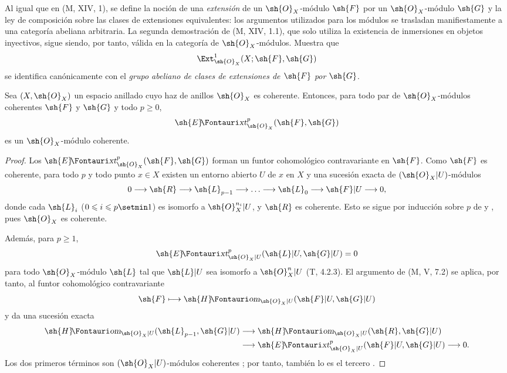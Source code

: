 \documentclass[oneside]{amsart}
\makeatletter
\renewcommand{\leq}{\leqslant}
\renewcommand{\geq}{\geqslant}
\newcommand*{\ega@sheafop}[3]{\sh{#1}#2\textup{\kern-2.2pt{\Fontauri\slshape #3}}}
\newcommand*{\shHom}{\ega@sheafop{H}{}{om}}
\newcommand*{\shExt}{\ega@sheafop{E}{}{xt}}
\let\EGAOriginalLabel\label
\renewcommand{\label}[1]{\phantomsection\EGAOriginalLabel{#1}}
\makeatother
\begin{document}
\begin{env}[12.3.2]
\label{0.12.3.2}
Al igual que en (M, XIV, 1), se define la noción de una
\emph{extensión} de un $\sh{O}_X$-módulo $\sh{F}$ por un
$\sh{O}_X$-módulo $\sh{G}$ y la ley de composición sobre las clases de
extensiones equivalentes: los argumentos utilizados para los módulos se
trasladan manifiestamente a una categoría abeliana arbitraria.
La segunda demostración de (M, XIV, 1.1), que solo utiliza la existencia de
inmersiones en objetos inyectivos, sigue siendo, por tanto, válida en la
categoría de $\sh{O}_X$-módulos.  Muestra que
\[
  \Ext^1_{\sh{O}_X}(X;\sh{F},\sh{G})
\]
se identifica canónicamente con el \emph{grupo abeliano de clases de
extensiones de $\sh{F}$ por $\sh{G}$}.
\end{env}

\begin{proposition}[12.3.3]
\label{0.12.3.3}
Sea $(X,\sh{O}_X)$ un espacio anillado cuyo haz de anillos
$\sh{O}_X$ es coherente.
Entonces, para todo par de $\sh{O}_X$-módulos coherentes $\sh{F}$ y
$\sh{G}$ y todo $p\geq0$,
\[
  \shExt^p_{\sh{O}_X}(\sh{F},\sh{G})
\]
es un $\sh{O}_X$-módulo coherente.
\end{proposition}

\begin{proof}
Los $\shExt^p_{\sh{O}_X}(\sh{F},\sh{G})$ forman un funtor cohomológico
contravariante en $\sh{F}$.
Como $\sh{F}$ es coherente, para todo $p$ y todo punto $x\in X$
existen un entorno abierto $U$ de $x$ en $X$ y una sucesión exacta
de $(\sh{O}_X|U)$-módulos
\[
  0\longrightarrow\sh{R}\longrightarrow\sh{L}_{p-1}
  \longrightarrow\ldots\longrightarrow\sh{L}_0
  \longrightarrow\sh{F}|U\longrightarrow0,
\]
donde cada $\sh{L}_i$ ($0\leq i\leq p\setmin 1$) es isomorfo a
$\sh{O}_X^{n_i}|U$, y $\sh{R}$ es coherente.
Esto se sigue por inducción sobre $p$ de
 y
, pues $\sh{O}_X$ es coherente.

Además, para $p\geq1$,
\[
  \shExt^p_{\sh{O}_X|U}(\sh{L}|U,\sh{G}|U)=0
\]
para todo $\sh{O}_X$-módulo $\sh{L}$ tal que $\sh{L}|U$ sea
isomorfo a $\sh{O}_X^n|U$ (T, 4.2.3).
El argumento de (M, V, 7.2) se aplica, por tanto, al funtor cohomológico
contravariante
\[
  \sh{F}\longmapsto
  \shHom_{\sh{O}_X|U}(\sh{F}|U,\sh{G}|U)
\]
y da una sucesión exacta
\[
  \begin{aligned}
  \shHom_{\sh{O}_X|U}(\sh{L}_{p-1},\sh{G}|U)
  &\longrightarrow
  \shHom_{\sh{O}_X|U}(\sh{R},\sh{G}|U)\\
  &\longrightarrow
  \shExt^p_{\sh{O}_X|U}(\sh{F}|U,\sh{G}|U)
  \longrightarrow0.
  \end{aligned}
\]
Los dos primeros términos son $(\sh{O}_X|U)$-módulos coherentes
; por tanto, también lo es el tercero
.
\end{proof}
\end{document}
